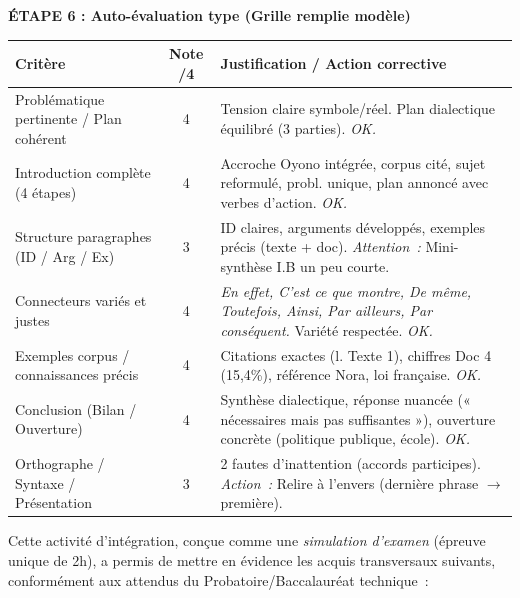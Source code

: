 \documentclass[11pt]{article}
\newcounter{popsec}
\newcounter{popsub}
\newcommand{\courssub}[1]{%
  \stepcounter{popsub}%
  \par\vspace{9pt}\noindent{\popxbold\fontsize{11.5}{13}\selectfont\color{popink}{\color{poporange}\thepopsec.\thepopsub}\hspace{6pt}#1}\par\nopagebreak\vspace{4pt}
}
\begin{document}
\begin{exoresolu}
\textbf{ÉTAPE 6 : Auto-évaluation type (Grille remplie modèle)}

\begin{center}
\begin{tabularx}{\linewidth}{|l|c|X|}\hline
\rowcolor{popblueL} \textbf{Critère} & \textbf{Note /4} & \textbf{Justification / Action corrective} \\ \hline
Problématique pertinente / Plan cohérent & 4 & Tension claire symbole/réel. Plan dialectique équilibré (3 parties). \textit{OK.} \\ \hline
Introduction complète (4 étapes) & 4 & Accroche Oyono intégrée, corpus cité, sujet reformulé, probl. unique, plan annoncé avec verbes d'action. \textit{OK.} \\ \hline
Structure paragraphes (ID / Arg / Ex) & 3 & ID claires, arguments développés, exemples précis (texte + doc). \textit{Attention~:} Mini-synthèse I.B un peu courte. \\ \hline
Connecteurs variés et justes & 4 & \emph{En effet, C'est ce que montre, De même, Toutefois, Ainsi, Par ailleurs, Par conséquent.} Variété respectée. \textit{OK.} \\ \hline
Exemples corpus / connaissances précis & 4 & Citations exactes (l. Texte 1), chiffres Doc 4 (15,4\%), référence Nora, loi française. \textit{OK.} \\ \hline
Conclusion (Bilan / Ouverture) & 4 & Synthèse dialectique, réponse nuancée (« nécessaires mais pas suffisantes »), ouverture concrète (politique publique, école). \textit{OK.} \\ \hline
Orthographe / Syntaxe / Présentation & 3 & 2 fautes d'inattention (accords participes). \textit{Action~:} Relire à l'envers (dernière phrase $\to$ première). \\ \hline
\end{tabularx}
\end{center}
\end{exoresolu}

\courssub{Bilan de l'activité}
\noindent Cette activité d'intégration, conçue comme une \emph{simulation d'examen} (épreuve unique de 2h), a permis de mettre en évidence les acquis transversaux suivants, conformément aux attendus du Probatoire/Baccalauréat technique~:
\end{document}
